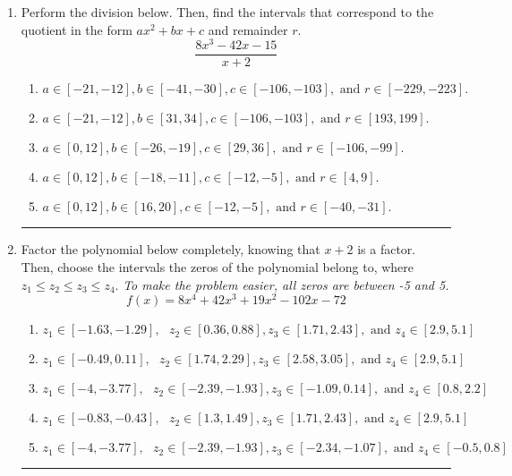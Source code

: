 \documentclass[14pt]{extbook}
\newcommand{\litem}[1]{\item#1\hspace*{-1cm}\rule{\textwidth}{0.4pt}}
\begin{document}
\begin{enumerate}
{\begin{enumerate}[label=\Alph*.]
\end{enumerate} }
\litem{
Perform the division below. Then, find the intervals that correspond to the quotient in the form $ax^2+bx+c$ and remainder $r$.\[ \frac{8x^{3} -42 x -15}{x + 2} \]\begin{enumerate}[label=\Alph*.]
\item \( a \in [-21, -12], b \in [-41, -30], c \in [-106, -103], \text{ and } r \in [-229, -223]. \)
\item \( a \in [-21, -12], b \in [31, 34], c \in [-106, -103], \text{ and } r \in [193, 199]. \)
\item \( a \in [0, 12], b \in [-26, -19], c \in [29, 36], \text{ and } r \in [-106, -99]. \)
\item \( a \in [0, 12], b \in [-18, -11], c \in [-12, -5], \text{ and } r \in [4, 9]. \)
\item \( a \in [0, 12], b \in [16, 20], c \in [-12, -5], \text{ and } r \in [-40, -31]. \)

\end{enumerate} }
\litem{
Factor the polynomial below completely, knowing that $x+2$ is a factor. Then, choose the intervals the zeros of the polynomial belong to, where $z_1 \leq z_2 \leq z_3 \leq z_4$. \textit{To make the problem easier, all zeros are between -5 and 5.}\[ f(x) = 8x^{4} +42 x^{3} +19 x^{2} -102 x -72 \]\begin{enumerate}[label=\Alph*.]
\item \( z_1 \in [-1.63, -1.29], \text{   }  z_2 \in [0.36, 0.88], z_3 \in [1.71, 2.43], \text{   and   } z_4 \in [2.9, 5.1] \)
\item \( z_1 \in [-0.49, 0.11], \text{   }  z_2 \in [1.74, 2.29], z_3 \in [2.58, 3.05], \text{   and   } z_4 \in [2.9, 5.1] \)
\item \( z_1 \in [-4, -3.77], \text{   }  z_2 \in [-2.39, -1.93], z_3 \in [-1.09, 0.14], \text{   and   } z_4 \in [0.8, 2.2] \)
\item \( z_1 \in [-0.83, -0.43], \text{   }  z_2 \in [1.3, 1.49], z_3 \in [1.71, 2.43], \text{   and   } z_4 \in [2.9, 5.1] \)
\item \( z_1 \in [-4, -3.77], \text{   }  z_2 \in [-2.39, -1.93], z_3 \in [-2.34, -1.07], \text{   and   } z_4 \in [-0.5, 0.8] \)

\end{enumerate} }
\end{enumerate}
\end{document}
